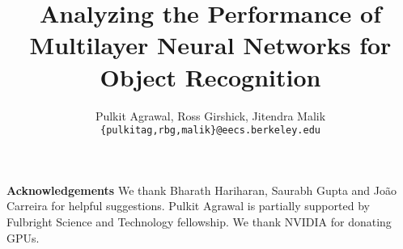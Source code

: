 \documentclass[runningheads]{llncs}
\begin{document}
\pagestyle{headings}
\mainmatter
\title{Analyzing the Performance of Multilayer Neural Networks for Object Recognition} %




\author{Pulkit Agrawal, Ross Girshick, Jitendra Malik\\
\texttt{\{pulkitag,rbg,malik\}@eecs.berkeley.edu}}


\maketitle





%
%


\vspace{3mm}
\noindent \textbf{Acknowledgements}
We thank Bharath Hariharan, Saurabh Gupta and Jo\~{a}o Carreira for helpful suggestions. Pulkit Agrawal is partially supported by Fulbright Science and Technology fellowship. We thank NVIDIA for donating GPUs.   










\end{document}
